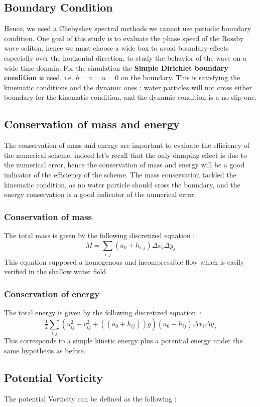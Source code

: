 \documentclass[11pt,a4paper]{report}
\begin{document}
\begin{multicols}{2}
    \subsection{Boundary Condition}
    Hence, we used a Chebyshev spectral methods we cannot use periodic boundary condition. One goal of this study is to evaluate the phase speed of the Rossby wave soliton, hence we must choose a wide box to avoid boundary effects especially over the horizontal direction, to study the behavior of the wave on a wide time domain.
    For the simulation the \textbf{Simple Dirichlet boundary condition} is used, i.e. $h = v = u = 0$ on the boundary. This is satisfying the kinematic conditions and the dynamic ones :
    water particles will not cross either boundary for the kinematic condition, and the dynamic condition is a no slip one.
    \subsection{Conservation of mass and energy}
    The conservation of mass and energy are important to evaluate the efficiency of the numerical scheme, indeed let's recall that the only damping effect is due to the numerical error, hence the conservation of mass and energy will be a good indicator of the efficiency of the scheme.
    The mass conservation tackled the kinematic condition, as no water particle should cross the boundary, and the energy conservation is a good indicator of the numerical error.

    \subsubsection{Conservation of mass}
    The total mass is given by the following discretized equation :
    $$M = \sum_{i,j} (a_0 + h_{i,j})\Delta x_i \Delta y_j$$
    This equation supposed a homogenous and incompressible flow which is easily verified in the shallow water field.

    \subsubsection{Conservation of energy}
    The total energy is given by the following discretized equation~:
    $$\tfrac{1}{2}\sum_{i,j}(u_{ij}^2 + v_{ij}^2 + ((a_0 + h_{ij}))g) (a_0 + h_{ij}) \Delta x_i \Delta y_j$$
    This corresponds to a simple kinetic energy plus a potential energy under the same hypothesis as before.
    \subsection{Potential Vorticity}
    The potential Vorticity can be defined as the following :


\end{multicols}
\end{document}
